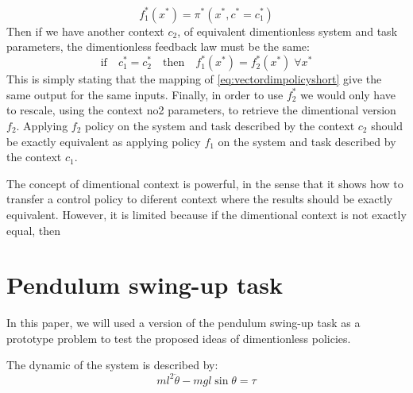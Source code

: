 \begin{equation}
f_1^*(x^*) = \pi^*( x^* , c^* = c_1^*)
\end{equation}
Then if we have another context $c_2$, of equivalent dimentionless system and task parameters, the dimentionless feedback law must be the same:
\begin{equation}
\text{if} \quad c_1^* = c_2^*  \quad \text{then} \quad f_1^*(x^*) = f_2^*(x^*) \; \forall x^*   
\end{equation}
This is simply stating that the mapping of \eqref{eq:vectordimpolicyshort} give the same output for the same inputs. Finally, in order to use $f_2^*$ we would only have to rescale, using the context no2 parameters, to retrieve the dimentional version $f_2$. Applying $f_2$ policy on the system and task described by the context $c_2$ should be exactly equivalent as applying policy $f_1$ on the system and task described by the context $c_1$. 

The concept of dimentional context is powerful, in the sense that it shows how to transfer a control policy to diferent context where the results should be exactly equivalent. However, it is limited because if the dimentional context is not exactly equal, then 






\newpage
\section{Pendulum swing-up task}
In this paper, we will used a version of the pendulum swing-up task as a prototype problem to test the proposed ideas of dimentionless policies.

The dynamic of the system is described by:
\begin{equation}
ml^2 \ddot{\theta} - mgl \sin \theta = \tau
\end{equation}

